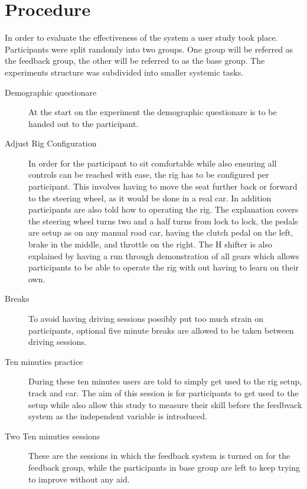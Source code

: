 \section{Procedure}
\label{sec:meth-experiment-structure}
In order to evaluate the effectiveness of the system a user study took place. Participants were split randomly into two groups. One group will be referred as the feedback group, the other will be referred to as the base group. The experiments structure was subdivided into smaller systemic tasks.

\begin{description}
	\item[Demographic questionare] At the start on the experiment the demographic questionare is to be handed out to the participant.
	
	\item[Adjust Rig Configuration] In order for the participant to sit comfortable while also ensuring all controls can be reached with ease, the rig has to be configured per participant. This involves having to move the seat further back or forward to the steering wheel, as it would be done in a real car. In addition participants are also told how to operating the rig. The explanation covers the steering wheel turns two and a half turns from lock to lock, the pedals are setup as on any manual road car, having the clutch pedal on the left, brake in the middle, and throttle on the right. The H shifter is also explained by having a run through demonstration of all gears which allows participants to be able to operate the rig with out having to learn on their own.
	
	\item[Breaks] To avoid having driving sessions possibly put too much strain on participants, optional five minute breaks are allowed to be taken between driving sessions. 
	
	\item[Ten minuties practice] During these ten minutes users are told to simply get used to the rig setup, track and car. The aim of this session is for participants to get used to the setup while also allow this study to measure their skill before the feedbvack system as the independent variable is introduced.
	
	\item[Two Ten minuties sessions] These are the sessions in which the feedback system is turned on for the feedback group, while the participants in base group are left to keep trying to improve without any aid. 
	

\end{description}
